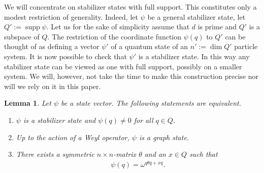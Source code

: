 \documentclass[aps,twocolumn,floatfix]{revtex4}
\newtheorem{lemma}[theorem]{Lemma}
\DeclareMathOperator{\supp}{supp}
\begin{document}
We will concentrate on stabilizer states with full support. This
constitutes only a modest restriction of generality. Indeed, let
$\psi$ be a general stabilizer state, let $Q':=\supp \psi$. Let us for
the sake of simplicity assume that $d$ is prime and $Q'$ is a subspace
of $Q$. The restriction of the coordinate function $\psi(q)$ to $Q'$
can be thought of as defining a vector $\psi'$ of a quantum state of
an $n':=\dim Q'$ particle system. It is now possible to check that
$\psi'$ is a stabilizer state. In this way any stabilizer state can be
viewed as one with full support, possibly on a smaller system. We
will, however, not take the time to make this construction precise nor
will we rely on it in this paper.

\begin{lemma}
	Let $\psi$ be a state vector. The following statements are
	equivalent.
	\begin{enumerate}
		\item\label{one}
		$\psi$ is a stabilizer state and $\psi(q)\neq 0$ for all $q\in Q$.

		\item\label{two}
		Up to the action of a Weyl operator, $\psi$ is a graph state.

		\item\label{three}
		There exists a symmetric $n\times n$-matrix $\theta$ and an $x\in
		Q$ such that
		\begin{eqnarray*}
			\psi(q) = \omega^{q\theta q+x q}.
		\end{eqnarray*}
	\end{enumerate}
\end{lemma}
\end{document}
